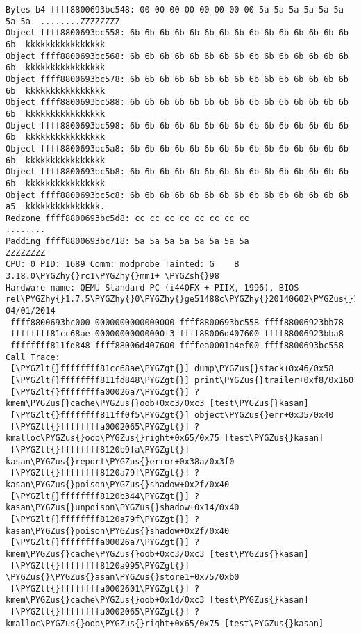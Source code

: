 \documentclass[a4paper,8pt,english]{sphinxmanual}
\def\PYGZus{\char`\_}
\def\PYGZlt{\char`\<}
\def\PYGZgt{\char`\>}
\def\PYGZsh{\char`\#}
\def\PYGZhy{\char`\-}
\begin{document}
\begin{Verbatim}[commandchars=\\\{\}]
Bytes b4 ffff8800693bc548: 00 00 00 00 00 00 00 00 5a 5a 5a 5a 5a 5a 5a 5a  ........ZZZZZZZZ
Object ffff8800693bc558: 6b 6b 6b 6b 6b 6b 6b 6b 6b 6b 6b 6b 6b 6b 6b 6b  kkkkkkkkkkkkkkkk
Object ffff8800693bc568: 6b 6b 6b 6b 6b 6b 6b 6b 6b 6b 6b 6b 6b 6b 6b 6b  kkkkkkkkkkkkkkkk
Object ffff8800693bc578: 6b 6b 6b 6b 6b 6b 6b 6b 6b 6b 6b 6b 6b 6b 6b 6b  kkkkkkkkkkkkkkkk
Object ffff8800693bc588: 6b 6b 6b 6b 6b 6b 6b 6b 6b 6b 6b 6b 6b 6b 6b 6b  kkkkkkkkkkkkkkkk
Object ffff8800693bc598: 6b 6b 6b 6b 6b 6b 6b 6b 6b 6b 6b 6b 6b 6b 6b 6b  kkkkkkkkkkkkkkkk
Object ffff8800693bc5a8: 6b 6b 6b 6b 6b 6b 6b 6b 6b 6b 6b 6b 6b 6b 6b 6b  kkkkkkkkkkkkkkkk
Object ffff8800693bc5b8: 6b 6b 6b 6b 6b 6b 6b 6b 6b 6b 6b 6b 6b 6b 6b 6b  kkkkkkkkkkkkkkkk
Object ffff8800693bc5c8: 6b 6b 6b 6b 6b 6b 6b 6b 6b 6b 6b 6b 6b 6b 6b a5  kkkkkkkkkkkkkkk.
Redzone ffff8800693bc5d8: cc cc cc cc cc cc cc cc                          ........
Padding ffff8800693bc718: 5a 5a 5a 5a 5a 5a 5a 5a                          ZZZZZZZZ
CPU: 0 PID: 1689 Comm: modprobe Tainted: G    B          3.18.0\PYGZhy{}rc1\PYGZhy{}mm1+ \PYGZsh{}98
Hardware name: QEMU Standard PC (i440FX + PIIX, 1996), BIOS rel\PYGZhy{}1.7.5\PYGZhy{}0\PYGZhy{}ge51488c\PYGZhy{}20140602\PYGZus{}164612\PYGZhy{}nilsson.home.kraxel.org 04/01/2014
 ffff8800693bc000 0000000000000000 ffff8800693bc558 ffff88006923bb78
 ffffffff81cc68ae 00000000000000f3 ffff88006d407600 ffff88006923bba8
 ffffffff811fd848 ffff88006d407600 ffffea0001a4ef00 ffff8800693bc558
Call Trace:
 [\PYGZlt{}ffffffff81cc68ae\PYGZgt{}] dump\PYGZus{}stack+0x46/0x58
 [\PYGZlt{}ffffffff811fd848\PYGZgt{}] print\PYGZus{}trailer+0xf8/0x160
 [\PYGZlt{}ffffffffa00026a7\PYGZgt{}] ? kmem\PYGZus{}cache\PYGZus{}oob+0xc3/0xc3 [test\PYGZus{}kasan]
 [\PYGZlt{}ffffffff811ff0f5\PYGZgt{}] object\PYGZus{}err+0x35/0x40
 [\PYGZlt{}ffffffffa0002065\PYGZgt{}] ? kmalloc\PYGZus{}oob\PYGZus{}right+0x65/0x75 [test\PYGZus{}kasan]
 [\PYGZlt{}ffffffff8120b9fa\PYGZgt{}] kasan\PYGZus{}report\PYGZus{}error+0x38a/0x3f0
 [\PYGZlt{}ffffffff8120a79f\PYGZgt{}] ? kasan\PYGZus{}poison\PYGZus{}shadow+0x2f/0x40
 [\PYGZlt{}ffffffff8120b344\PYGZgt{}] ? kasan\PYGZus{}unpoison\PYGZus{}shadow+0x14/0x40
 [\PYGZlt{}ffffffff8120a79f\PYGZgt{}] ? kasan\PYGZus{}poison\PYGZus{}shadow+0x2f/0x40
 [\PYGZlt{}ffffffffa00026a7\PYGZgt{}] ? kmem\PYGZus{}cache\PYGZus{}oob+0xc3/0xc3 [test\PYGZus{}kasan]
 [\PYGZlt{}ffffffff8120a995\PYGZgt{}] \PYGZus{}\PYGZus{}asan\PYGZus{}store1+0x75/0xb0
 [\PYGZlt{}ffffffffa0002601\PYGZgt{}] ? kmem\PYGZus{}cache\PYGZus{}oob+0x1d/0xc3 [test\PYGZus{}kasan]
 [\PYGZlt{}ffffffffa0002065\PYGZgt{}] ? kmalloc\PYGZus{}oob\PYGZus{}right+0x65/0x75 [test\PYGZus{}kasan]

\end{Verbatim}
\end{document}
